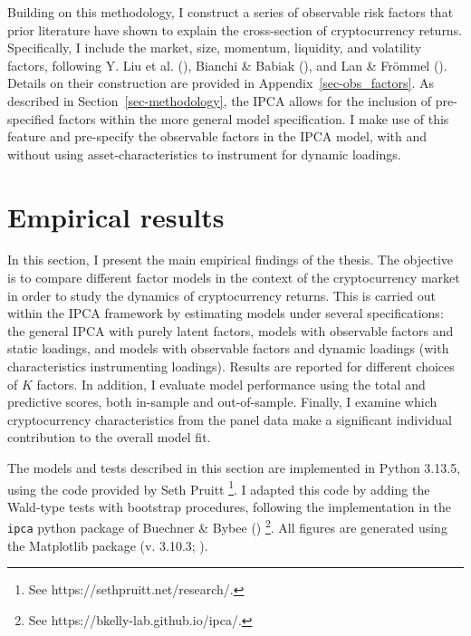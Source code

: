 \documentclass[
  12pt,
  a4paper,
  openany]{scrbook}
\begin{document}
Building on this methodology, I construct a series of observable risk
factors that prior literature have shown to explain the cross-section of
cryptocurrency returns. Specifically, I include the market, size,
momentum, liquidity, and volatility factors, following Y. Liu et al.
(), Bianchi \& Babiak
(), and Lan \& Frömmel
(). Details on their construction
are provided in Appendix~\ref{sec-obs_factors}. As described in
Section~\ref{sec-methodology}, the IPCA allows for the inclusion of
pre-specified factors within the more general model specification. I
make use of this feature and pre-specify the observable factors in the
IPCA model, with and without using asset-characteristics to instrument
for dynamic loadings.


\chapter{Empirical results}\label{empirical-results}

In this section, I present the main empirical findings of the thesis.
The objective is to compare different factor models in the context of
the cryptocurrency market in order to study the dynamics of
cryptocurrency returns. This is carried out within the IPCA framework by
estimating models under several specifications: the general IPCA with
purely latent factors, models with observable factors and static
loadings, and models with observable factors and dynamic loadings (with
characteristics instrumenting loadings). Results are reported for
different choices of \(K\) factors. In addition, I evaluate model
performance using the total and predictive scores, both in-sample and
out-of-sample. Finally, I examine which cryptocurrency characteristics
from the panel data make a significant individual contribution to the
overall model fit.

The models and tests described in this section are implemented in Python
3.13.5, using the code provided by Seth Pruitt \footnote{See
  https://sethpruitt.net/research/.}. I adapted this code by adding the
Wald-type tests with bootstrap procedures, following the implementation
in the \texttt{ipca} python package of Buechner \& Bybee
() \footnote{See
  https://bkelly-lab.github.io/ipca/.}. All figures are generated using
the Matplotlib package (v. 3.10.3; ).
\end{document}
